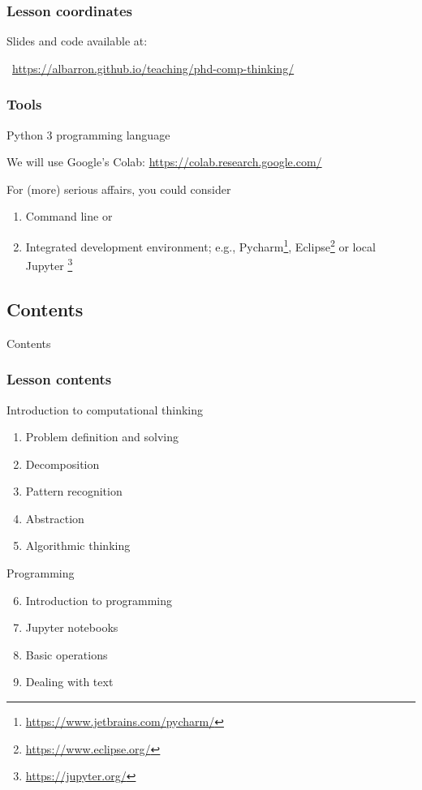 \documentclass[xcolor=x11names]{beamer}
\begin{document}
\begin{frame}
\frametitle{Lesson coordinates}
Slides and code available at:
\bigskip

\faFirefox\, \url{https://albarron.github.io/teaching/phd-comp-thinking/}

\end{frame}

\begin{frame}
\frametitle{Tools}

\alert{Python 3} programming language

We will use Google's Colab: \url{https://colab.research.google.com/}
\bigskip 

For (more) serious affairs, you could consider
\begin{enumerate}
	\item Command line \alert{or}
	\item Integrated development environment; e.g.,
	Pycharm\footnote{\url{https://www.jetbrains.com/pycharm/}},
	Eclipse\footnote{\url{https://www.eclipse.org/}} \alert{or}
	local Jupyter%
	\footnote{\url{https://jupyter.org/}}
\end{enumerate}
\end{frame}

\begin{frame}
\section{Contents}
\centering
\alert{Contents}
\end{frame}

\begin{frame}
 \frametitle{Lesson contents}
\alert{Introduction to computational thinking}

\begin{enumerate}
 \item Problem definition and solving
 \item Decomposition
 \item Pattern recognition
 \item Abstraction
 \item Algorithmic thinking
\end{enumerate}
\bigskip 	\pause 

\alert{Programming}
\begin{enumerate}\setcounter{enumi}{5}
 \item Introduction to programming
 \item Jupyter notebooks
 \item Basic operations
 \item Dealing with text
\end{enumerate}
\end{frame}
\end{document}
